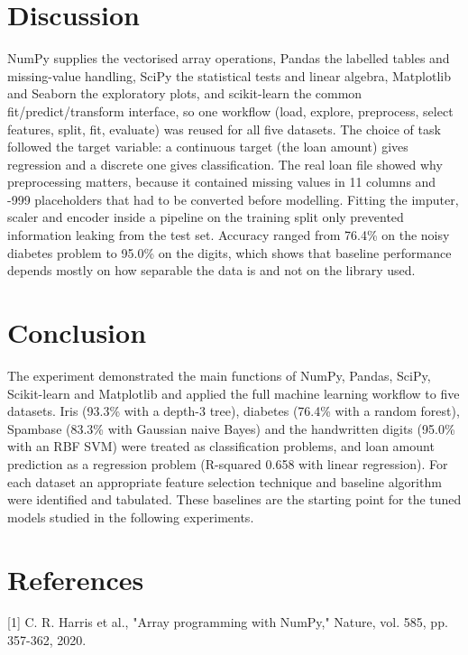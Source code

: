 \documentclass[11pt]{article}
\begin{document}
\section*{Discussion}
\label{sec:org4d76f94}


NumPy supplies the vectorised array operations, Pandas the labelled tables and missing-value
handling, SciPy the statistical tests and linear algebra, Matplotlib and Seaborn the
exploratory plots, and scikit-learn the common fit/predict/transform interface, so one
workflow (load, explore, preprocess, select features, split, fit, evaluate) was reused for
all five datasets. The choice of task followed the target variable: a continuous target (the
loan amount) gives regression and a discrete one gives classification. The real loan file
showed why preprocessing matters, because it contained missing values in 11 columns and -999
placeholders that had to be converted before modelling. Fitting the imputer, scaler and
encoder inside a pipeline on the training split only prevented information leaking from the
test set. Accuracy ranged from 76.4\% on the noisy diabetes problem to 95.0\% on the digits,
which shows that baseline performance depends mostly on how separable the data is and not on
the library used.

\section*{Conclusion}
\label{sec:org74a2346}


The experiment demonstrated the main functions of NumPy, Pandas, SciPy, Scikit-learn and
Matplotlib and applied the full machine learning workflow to five datasets. Iris (93.3\% with
a depth-3 tree), diabetes (76.4\% with a random forest), Spambase (83.3\% with Gaussian naive
Bayes) and the handwritten digits (95.0\% with an RBF SVM) were treated as classification
problems, and loan amount prediction as a regression problem (R-squared 0.658 with linear
regression). For each dataset an appropriate feature selection technique and baseline
algorithm were identified and tabulated. These baselines are the starting point for the
tuned models studied in the following experiments.

\section*{References}
\label{sec:org5ea972f}


[1] C. R. Harris et al., "Array programming with NumPy," Nature, vol. 585, pp. 357-362, 2020.
\end{document}
